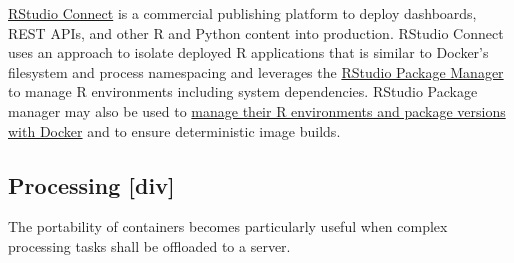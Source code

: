\href{https://rstudio.com/products/connect/}{RStudio Connect} is a
commercial publishing platform to deploy dashboards, REST APIs, and
other R and Python content into production. RStudio Connect uses an
approach to isolate deployed R applications that is similar to Docker's
filesystem and process namespacing and leverages the
\href{https://rstudio.com/products/package-manager/}{RStudio Package
Manager} to manage R environments including system dependencies. RStudio
Package manager may also be used to
\href{https://environments.rstudio.com/docker}{manage their R
environments and package versions with Docker} and to ensure
deterministic image builds.

\hypertarget{processing-div}{%
\subsection{Processing {[}div{]}}\label{processing-div}}

The portability of containers becomes particularly useful when complex
processing tasks shall be offloaded to a server.

